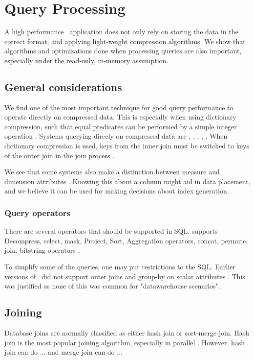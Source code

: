 \chapter{Query Processing}
\label{chap:Query Processing}
A high performance \bd~application does not only rely on storing the data in the correct format, and applying light-weight compression algorithms. We show that algorithms and optimizations done when processing queries are also important, especially under the read-only, in-memory assumption.
\newpage

\section{General considerations}
\label{sec:General considerations}
We find one of the most important technique for good query performance to operate directly on compressed data. This is especially when using dictionary compression, such that equal predicates can be performed by a simple integer operation \cite{Abadi2008-dd}. Systems querying direcly on compressed data are \cstore, \ibm, \mssql, \blink, \saph. When dictionary compression is used, keys from the inner join must be switched to keys of the outer join in the join process \cite{Raman2013-em}.

We see that some systems also make a distinction between measure and dimension attributes \cite{Kamkolkar2015-iq, Johnson2008-cp}. Knowing this about a column might aid in data placement, and we believe it can be used for making decisions about index generation.

\subsection{Query operators}
\label{sub:Query operators}
There are several operators that should be supported in SQL. \cstore supports Decompress, select, mask, Project, Sort, Aggregation operators, concat, permute, join, bitstring operators \cite{Stonebraker2005-qz}.

To simplify some of the queries, one may put restrictions to the SQL. Earlier versions of \mssql~did not support outer joins and group-by on scalar attributes \cite{Larson2013-mc}. This was justified as none of this was common for "datawarehouse scenarios".~


\section{Joining}
\label{sec:Joining}
Database joins are normally classified as either hash join or sort-merge join. Hash join is the most popular joining algorithm, especially in parallel \cite{Boncz2002-yj}. However, hash join can do ... and merge join can do ... \cite{DeWitt1992-ki}

